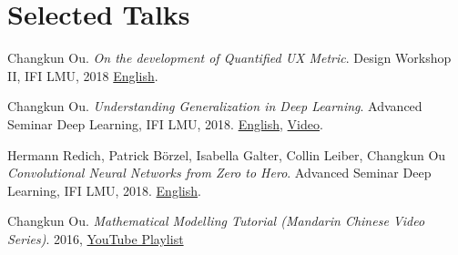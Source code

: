 \section{\textbf{Selected Talks}}
 \resumeSubHeadingListStart
    \item{
      Changkun Ou.
      \emph{On the development of Quantified UX Metric}.
      Design Workshop II, IFI LMU, 2018 \href{https://github.com/changkun/talks/blob/master/201805/qux.pdf}{English}.
    }
    \item{
      Changkun Ou.
      \emph{Understanding Generalization in Deep Learning}.
      Advanced Seminar Deep Learning, IFI LMU, 2018. \href{https://docs.google.com/presentation/d/1eNUYH9_3bbBO7bONPU8BCTr2DOMC69gdOJvBgpLjwNg/edit#slide=id.g2cdf1dbd0b_1_6}{English}, \href{https://www.youtube.com/watch?v=z9je5YlnBgI&t=1585s}{Video}.
    }   
    \item{
      Hermann Redich, Patrick Börzel, Isabella Galter, Collin Leiber, Changkun Ou
      \emph{Convolutional Neural Networks from Zero to Hero}.
      Advanced Seminar Deep Learning, IFI LMU, 2018. \href{https://github.com/changkun/talks/blob/master/201712/cnn.pdf}{English}.
    }
    \item{
        Changkun Ou.
        \emph{Mathematical Modelling Tutorial (Mandarin Chinese Video Series)}.
        2016, \href{https://www.youtube.com/watch?v=EUfXE3vP9_A&list=PLwUqqMt5en7c7iZIseCVAS5BX6RPkS-qR}{YouTube Playlist}
    }
 \resumeSubHeadingListEnd